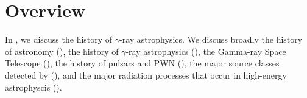 
\chapter{Overview}

In , we discuss the history of $\gamma$-ray
astrophysics. We discuss broadly the history of astronomy
(), the history of $\gamma$-ray
astrophysics (), the \fermi
Gamma-ray Space Telescope (), the history of
pulsars and \ac{PWN} (), the major source
classes detected by \fermi (), and
the major radiation processes that occur in high-energy astrophyscis
().











